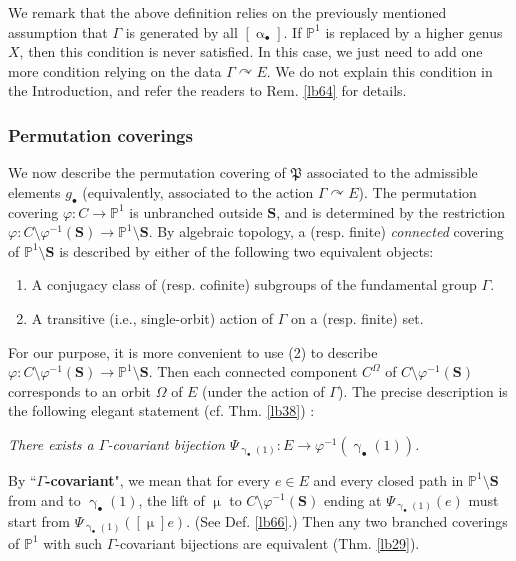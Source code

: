 \documentclass[12pt,a4paper,notitlepage]{article}
\theoremstyle{definition}
\theoremstyle{plain}
\newcommand{\fk}{\mathfrak}
\newcommand{\blt}{\bullet}
\newcommand{\Pbb}{\mathbb P}
\newcommand{\Sbf}{\mathbf{S}}
\numberwithin{equation}{subsection}
\begin{document}
We remark that the above definition relies on the previously mentioned assumption that $\Gamma$ is generated by all $[\upalpha_\blt]$. If $\Pbb^1$ is replaced by a higher genus $X$, then this condition is never satisfied. In this case, we just need to add one more condition relying on the data $\Gamma\curvearrowright E$. We do not explain this condition in the Introduction, and refer the readers to Rem. \ref{lb64} for details.


\subsubsection*{Permutation coverings}


We now describe the permutation covering of $\fk P$ associated to the admissible elements $g_\blt$ (equivalently, associated to the action $\Gamma\curvearrowright E$). The permutation covering  $\varphi:C\rightarrow\Pbb^1$ is unbranched outside $\Sbf$, and is determined by the restriction $\varphi:C\setminus\varphi^{-1}(\Sbf)\rightarrow\Pbb^1\setminus\Sbf$. By algebraic topology, a (resp. finite) \textit{connected} covering of $\Pbb^1\setminus\Sbf$ is described by either of the following two equivalent objects: 
\begin{enumerate}[label=(\arabic*)]
\item A conjugacy class of (resp. cofinite) subgroups of the fundamental group $\Gamma$.
\item A transitive (i.e., single-orbit) action of $\Gamma$  on a (resp. finite) set.
\end{enumerate}
For our purpose, it is more convenient to use (2) to describe $\varphi:C\setminus\varphi^{-1}(\Sbf)\rightarrow\Pbb^1\setminus\Sbf$. Then each connected component $C^\Omega$ of $C\setminus\varphi^{-1}(\Sbf)$ corresponds to an orbit $\Omega$ of $E$ (under the action of $\Gamma$). The precise description is the following elegant statement (cf. Thm. \ref{lb38}) :

\textit{There exists a $\Gamma$-covariant bijection $\Psi_{\upgamma_\blt(1)}:E\rightarrow\varphi^{-1}(\upgamma_\blt(1))$.} 

By ``\textbf{$\Gamma$-covariant}", we mean that for every $e\in E$ and every closed path in $\Pbb^1\setminus\Sbf$ from and to $\upgamma_\blt(1)$, the lift of $\upmu$ to $C\setminus\varphi^{-1}(\Sbf)$ ending at $\Psi_{\upgamma_\blt(1)}(e)$ must start from $\Psi_{\upgamma_\blt(1)}([\upmu]e)$. (See Def. \ref{lb66}.) Then any two branched coverings of $\Pbb^1$ with such $\Gamma$-covariant bijections are equivalent (Thm. \ref{lb29}).
\end{document}
